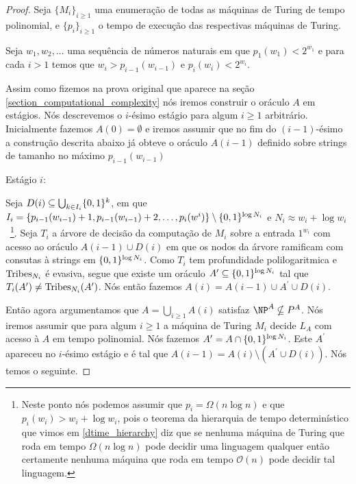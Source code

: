 \begin{proof}

Seja $\{M_{i}\}_{i \geq 1}$ uma enumeração de todas as máquinas de Turing de tempo polinomial, e $\{p_{i}\}_{i \geq 1}$ o tempo de execução das respectivas máquinas de Turing.

Seja $w_{1}, w_{2}, \dots$ uma sequência de números naturais em que $p_{1}(w_{1}) < 2^{w_{1}}$ e para cada $i > 1$ temos que $w_{i} > p_{i - 1}(w_{i - 1})$ e $p_{i}(w_{i}) < 2^{w_{i}}$.

Assim como fizemos na prova original que aparece na seção \ref{section_computational_complexity} nós iremos construir o oráculo $A$ em estágios. Nós descrevemos o $i$-ésimo estágio para algum $i \geq 1$ arbitrário. Inicialmente fazemos $A(0) = \emptyset$ e iremos assumir que no fim do $(i -1)$-ésimo a construção descrita abaixo já obteve o oráculo $A(i - 1)$ definido sobre strings de tamanho no máximo $p_{i - 1}(w_{i - 1})$

Estágio $i$:

Seja $D(i) \subseteq \bigcup_{k \in I_{i}} \{0, 1\}^{k}$, em que $I_{i} = \{p_{i - 1}(w_{i - 1}) + 1, p_{i - 1}(w_{i - 1}) + 2, \dots, p_{i}(w^{i}) \} \setminus \{0, 1\}^{\log N_{i}}$ e $N_{i} \approx w_{i} + \log w_{i}$~\footnote{Neste ponto nós podemos assumir que $p_{i} = \Omega(n \log n)$ e que $p_{i}(w_{i}) > w_{i} + \log w_{i}$, pois o teorema da hierarquia de tempo determinístico que vimos em \ref{dtime_hierarchy} diz que se nenhuma máquina de Turing que roda em tempo $\Omega(n \log n)$ pode decidir uma linguagem qualquer então certamente nenhuma máquina que roda em tempo $\mathcal{O}(n)$ pode decidir tal linguagem.}. Seja $T_{i}$ a árvore de decisão da computação de $M_{i}$ sobre a entrada $1^{w_{i}}$ com acesso ao oráculo $A(i - 1) \cup D(i)$ em que os nodos da árvore ramificam com consutas à strings em $\{0, 1\}^{\log N_{i}}$.  Como $T_{i}$ tem profundidade polilogaritmica e $\text{Tribes}_{N_{i}}$ é evasiva, segue que existe um oráculo $A^{\prime} \subseteq \{0, 1\}^{\log N_{i}}$ tal que $T_{i}(A^{\prime}) \neq \text{Tribes}_{N_{i}}(A^{\prime})$. Nós então fazemos $A(i) = A(i - 1) \cup A^{\prime} \cup D(i)$.

Então agora argumentamos que $A = \bigcup_{i \geq 1} A(i)$ satisfaz $\NP^{A} \nsubseteq P^{A}$. Nós iremos assumir que para algum $i \geq 1$ a máquina de Turing $M_{i}$ decide $L_{A}$ com acesso à $A$ em tempo polinomial. Nós fazemos $A^{\prime} = A \cap \{0, 1\}^{\log N_{i}}$. Este $A^{\prime}$ apareceu no $i$-ésimo estágio e é tal que $A(i - 1) = A(i) \setminus (A^{\prime} \cup D(i))$. Nós temos o seguinte.


\end{proof}
